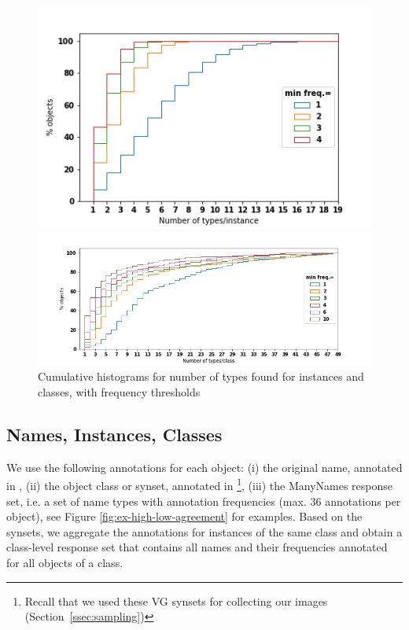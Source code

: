 \begin{figure}
\begin{minipage}[b]{0.4\linewidth}
\includegraphics[scale=.4]{figures/types_instances.png}
\end{minipage}
\begin{minipage}[b]{0.6\linewidth}
\includegraphics[scale=.4]{figures/types_classes.png}
\end{minipage}
\vspace{-0.8cm}
 \caption{\label{fig:ntypes} Cumulative histograms for number of types found for instances and classes, with frequency thresholds}
\end{figure}

\subsection{Names, Instances, Classes}
\label{subsec:counts}

We use the following annotations for each object: (i) the original name, annotated in \vg, (ii) the object class or synset, annotated in \vg\footnote{Recall that we used these VG synsets for collecting our images (Section~\ref{ssec:sampling})},
 (iii) the ManyNames response set, i.e. a set of name types with annotation frequencies (max. 36 annotations per object),  see Figure \ref{fig:ex-high-low-agreement} for examples.
 Based on the \vg synsets, we aggregate the annotations for instances of the same class and obtain a class-level response set that contains all names and their frequencies annotated for all objects of a class. 
 
